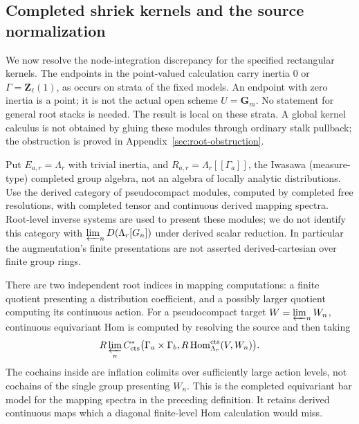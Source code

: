 \documentclass[11pt]{article}
\theoremstyle{definition}
\theoremstyle{remark}
\begin{document}
\subsection{Completed shriek kernels and the source normalization}
\label{sec:completed-shriek-normalization}
We now resolve the node-integration discrepancy for the specified
rectangular kernels.  The endpoints in the point-valued calculation carry
inertia $0$ or $\Gamma=\mathbf Z_\ell(1)$, as occurs on strata
of the fixed models.  An endpoint with zero inertia is a point;
it is not the actual open scheme $U=\mathbf G_m$.  No statement for general
root stacks is needed.  The result is local on these strata.  A global kernel calculus is
not obtained by gluing these modules through ordinary stalk pullback;
the obstruction is proved in Appendix~\ref{sec:root-obstruction}.

Put $E_{a,r}=\Lambda_r$ with trivial inertia, and
$R_{a,r}=\Lambda_r[[\Gamma_a]]$, the Iwasawa (measure-type)
completed group algebra, not an algebra of locally analytic
distributions.  Use the derived category of
pseudocompact modules, computed by completed free resolutions,
with completed tensor and continuous derived mapping spectra.
Root-level inverse systems are used to present these modules;
we do not identify this category with
$\varprojlim_n D(\Lambda_r[G_n])$ under derived scalar reduction.
In particular the augmentation's finite presentations are not
asserted derived-cartesian over finite group rings.

There are two independent root indices in mapping computations:
a finite quotient presenting a distribution coefficient, and a
possibly larger quotient computing its continuous action.  For a
pseudocompact target $W=\varprojlim_nW_n$, continuous equivariant
Hom is computed by resolving the source and then taking
\[
 R\varprojlim_n C^*_{\mathrm{cts}}
  \bigl(\Gamma_a\times\Gamma_b,
     R\operatorname{Hom}^{\mathrm{cts}}_{\Lambda_r}(V,W_n)\bigr).
\]
The cochains inside are inflation colimits over sufficiently large
action levels, not cochains of the single group presenting $W_n$.
This is the completed equivariant bar model for the mapping spectra
in the preceding definition.  It retains derived continuous maps
which a diagonal finite-level Hom calculation would miss.
\end{document}
